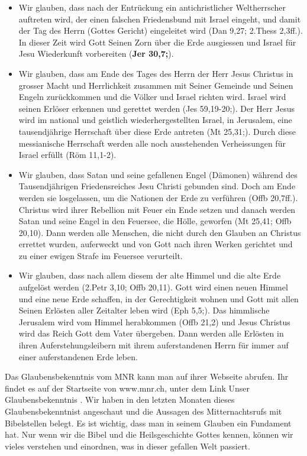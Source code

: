 \documentclass{../../inc/mybib}
\begin{document}
\begin{spacing}{1.5}
\begin{enumerate}
\begin{itemize}
            \item Wir glauben, dass nach der Entrückung ein antichristlicher Weltherrscher auftreten wird, der einen falschen Friedensbund mit Israel eingeht, und damit der Tag des Herrn (Gottes Gericht) eingeleitet wird (Dan 9,27; 2.Thess 2,3ff.). In dieser Zeit wird Gott Seinen Zorn über die Erde ausgiessen und Israel für Jesu Wiederkunft vorbereiten (\textbf{Jer 30,7;}).
        
            \item Wir glauben, dass am Ende des Tages des Herrn der Herr Jesus Christus in grosser Macht und Herrlichkeit zusammen mit Seiner Gemeinde und Seinen Engeln zurückkommen und die Völker und Israel richten wird. Israel wird seinen Erlöser erkennen und gerettet werden (Jes 59,19-20;). Der Herr Jesus wird im national und geistlich wiederhergestellten Israel, in Jerusalem, eine tausendjährige Herrschaft über diese Erde antreten (Mt 25,31;). Durch diese messianische Herrschaft werden alle noch ausstehenden Verheissungen für Israel erfüllt (Röm 11,1-2).
        
            \item Wir glauben, dass Satan und seine gefallenen Engel (Dämonen) während des Tausendjährigen Friedensreiches Jesu Christi gebunden sind. Doch am Ende werden sie losgelassen, um die Nationen der Erde zu verführen (Offb 20,7ff.). Christus wird ihrer Rebellion mit Feuer ein Ende setzen und danach werden Satan und seine Engel in den Feuersee, die Hölle, geworfen (Mt 25,41; Offb 20,10). Dann werden alle Menschen, die nicht durch den Glauben an Christus errettet wurden, auferweckt und von Gott nach ihren Werken gerichtet und zu einer ewigen Strafe im Feuersee verurteilt.
        
            \item Wir glauben, dass nach allem diesem der alte Himmel und die alte Erde aufgelöst werden (2.Petr 3,10; Offb 20,11). Gott wird einen neuen Himmel und eine neue Erde schaffen, in der Gerechtigkeit wohnen und Gott mit allen Seinen Erlösten aller Zeitalter leben wird (Eph 5,5;). Das himmlische Jerusalem wird vom Himmel herabkommen (Offb 21,2) und Jesus Christus wird das Reich Gott dem Vater übergeben. Dann werden alle Erlösten in ihren Auferstehungsleibern mit ihrem auferstandenen Herrn für immer auf einer auferstandenen Erde leben.
        \end{itemize}
    \end{enumerate}
    Das Glaubensbekenntnis vom MNR kann man auf ihrer Webseite abrufen. Ihr findet es auf der Startseite von www.mnr.ch, unter dem Link \frqq Unser Glaubensbekenntnis \flqq{}.
    Wir haben in den letzten Monaten dieses Glaubensbekenntnist angeschaut und die Aussagen des Mitternachtsrufs mit Bibelstellen belegt. Es ist wichtig, dass man in seinem Glauben ein Fundament hat. Nur wenn wir die Bibel und die Heilsgeschichte Gottes kennen, können wir vieles verstehen und einordnen, was in dieser gefallen Welt passiert.
    

\end{spacing}
\end{document}
